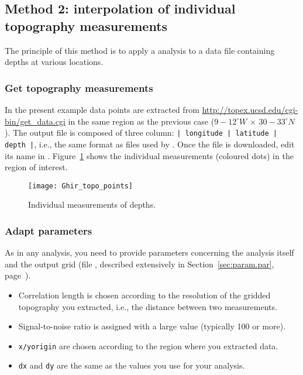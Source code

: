 \subsection{Method 2: interpolation of individual topography measurements\label{sec:topotopex}}

The principle of this method is to apply a \diva analysis to a data file containing depths at various locations.

\subsubsection{Get topography measurements}

In the present example data points are extracted from \url{http://topex.ucsd.edu/cgi-bin/get_data.cgi} in the same region as the previous case ($9-12^{\circ}W\, \times\, 30-33^{\circ}N$). The output file is composed of three column: \texttt{| longitude | latitude | depth |}, i.e., the same format as  files used by \diva. Once the file is downloaded, edit its name in . Figure~\ref{fig:guirtopo} shows the individual measurements (coloured dots) in the region of interest. 


\begin{figure}[htpb]
\centering
\texttt{[image: Ghir\_topo\_points]}
\caption{Individual measurements of depths.\label{fig:guirtopo}}
\end{figure}


\subsubsection{Adapt parameters}

As in any \diva analysis, you need to provide parameters concerning the analysis itself and the output grid (file , described extensively in Section~\ref{sec:param.par}, page~\pageref{sec:param.par}). 

\begin{itemize}
\item Correlation length is chosen according to the resolution of the gridded topography you extracted, i.e., the distance between two measurements.
\item Signal-to-noise ratio is assigned with a large value (typically 100 or more).
\item \texttt{x/yorigin} are chosen according to the region where you extracted data.
\item \texttt{dx} and \texttt{dy} are the same as the values you use for your analysis. 
\end{itemize}



